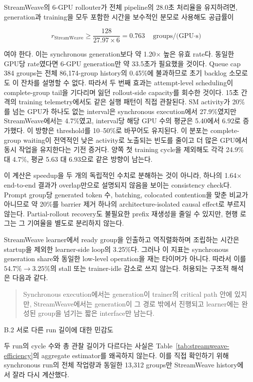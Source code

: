 StreamWeave의 6-GPU rollouter가 전체 pipeline의 28.0초 처리율을 유지하려면, generation과
training을 모두 포함한 시간을 보수적인 분모로 사용해도 공급률이

\[
r_{\mathrm{StreamWeave}}
\ge
\frac{128}{27.97\times 6}
=
0.763
\quad\text{groups/(GPU$\cdot$s)}
\]

여야 한다. 이는 synchronous generation보다 약 1.20$\times$ 높은 유효 rate다. 동일한 GPU당
rate였다면 6-GPU generation만 약 33.5초가 필요했을 것이다. Queue cap 384 groups는 전체
86,174-group history의 0.45\%에 불과하므로 초기 backlog 소모로도 이 잔차를 설명할 수 없다.
따라서 두 번째 효과는 attempt-level scheduling이 complete-group tail을 기다리며 잃던 rollout-side
capacity를 회수한 것이다. 15초 간격의 training telemetry에서도 같은 실행 패턴이 직접 관찰된다.
SM activity가 20\%를 넘는 GPU가 하나도 없는 interval은 synchronous execution에서 27.9\%였지만
StreamWeave에서는 4.7\%였고, interval당 해당 GPU 수의 평균은 5.40에서 6.92로 증가했다. 이 방향은
threshold를 10--50\%로 바꾸어도 유지된다. 이 분포는 complete-group waiting이 전역적인 낮은
activity로 노출되는 빈도를 줄이고 더 많은 GPU에서 동시 작업을 유지한다는 기전 증거다. 양쪽 첫
training cycle을 제외해도 각각 24.9\% 대 4.7\%, 평균 5.63 대 6.93으로 같은 방향이 남는다.

이 계산은 speedup을 두 개의 독립적인 수치로 분해하는 것이 아니라, 하나의 1.64$\times$ end-to-end
결과가 overlap만으로 설명되지 않음을 보이는 consistency check다. Prompt group당 generated token
수, batching, colocated contention을 맞춘 비교가 아니므로 약 20\%를 barrier 제거 하나의
architecture-isolated causal effect로 부르지 않는다. Partial-rollout recovery도 불필요한 prefix
재생성을 줄일 수 있지만, 현행 로그는 그 기여율을 별도로 분리하지 않는다.

StreamWeave learner에서 ready group을 인출하고 역직렬화하며 조립하는 시간은 startup을 제외한
learner-side loop의 3.25\%다. 그러나 이 지표는 synchronous generation share와 동일한 low-level
operation을 재는 타이머가 아니다. 따라서 이를 \(54.7\%\to3.25\%\)의 stall 또는 trainer-idle
감소로 쓰지 않는다. 허용되는 구조적 해석은 다음과 같다.

\begin{quote}
Synchronous execution에서는 generation이 trainer의 critical path 안에 있지만,
StreamWeave에서는 generation이 그 경로 밖에서 진행되고 learner에는 완성된 group을 넘기는
짧은 interface만 남는다.
\end{quote}

B.2 서로 다른 run 길이에 대한 민감도

두 run의 cycle 수와 총 관찰 길이가 다르다는 사실은 Table~\ref{tab:streamweave-efficiency}의
aggregate estimator를 왜곡하지 않는다. 이를 직접 확인하기 위해 synchronous run의 전체 작업량과
동일한 13{,}312 groups만 StreamWeave history에서 잘라 다시 계산했다.

